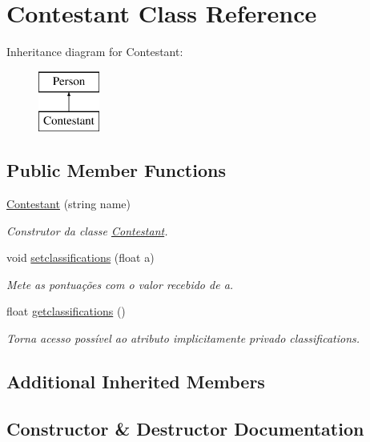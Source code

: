 \hypertarget{class_contestant}{}\section{Contestant Class Reference}
\label{class_contestant}
Inheritance diagram for Contestant\+:\begin{figure}[H]
\begin{center}
\leavevmode
\includegraphics[height=2.000000cm]{class_contestant}
\end{center}
\end{figure}
\subsection*{Public Member Functions}
\begin{DoxyCompactItemize}
\item 
\hyperlink{class_contestant_ae7f87cb89034779cc078fd846f7dd9df}{Contestant} (string name)
\begin{DoxyCompactList}\small\item\em Construtor da classe \hyperlink{class_contestant}{Contestant}. \end{DoxyCompactList}\item 
void \hyperlink{class_contestant_a1e93516729ecfd8d49fc5dc6b8d2e01a}{setclassifications} (float a)
\begin{DoxyCompactList}\small\item\em Mete as pontuações com o valor recebido de a. \end{DoxyCompactList}\item 
float \hyperlink{class_contestant_afd136f110593d3e5dcd2bafa5454b973}{getclassifications} ()
\begin{DoxyCompactList}\small\item\em Torna acesso possível ao atributo implicitamente privado classifications. \end{DoxyCompactList}\end{DoxyCompactItemize}
\subsection*{Additional Inherited Members}


\subsection{Constructor \& Destructor Documentation}
\hypertarget{class_contestant_ae7f87cb89034779cc078fd846f7dd9df}{}\label{class_contestant_ae7f87cb89034779cc078fd846f7dd9df} 
